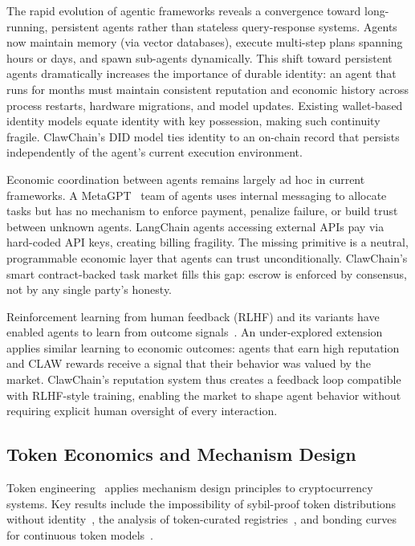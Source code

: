 \documentclass[conference]{IEEEtran}
\begin{document}
The rapid evolution of agentic frameworks reveals a convergence toward long-running, persistent agents rather than stateless query-response systems. Agents now maintain memory (via vector databases), execute multi-step plans spanning hours or days, and spawn sub-agents dynamically. This shift toward persistent agents dramatically increases the importance of durable identity: an agent that runs for months must maintain consistent reputation and economic history across process restarts, hardware migrations, and model updates. Existing wallet-based identity models equate identity with key possession, making such continuity fragile. ClawChain's DID model ties identity to an on-chain record that persists independently of the agent's current execution environment.

Economic coordination between agents remains largely ad hoc in current frameworks. A MetaGPT~\cite{hong2024metagpt} team of agents uses internal messaging to allocate tasks but has no mechanism to enforce payment, penalize failure, or build trust between unknown agents. LangChain agents accessing external APIs pay via hard-coded API keys, creating billing fragility. The missing primitive is a neutral, programmable economic layer that agents can trust unconditionally. ClawChain's smart contract-backed task market fills this gap: escrow is enforced by consensus, not by any single party's honesty.

Reinforcement learning from human feedback (RLHF) and its variants have enabled agents to learn from outcome signals~\cite{ouyang2022rlhf}. An under-explored extension applies similar learning to economic outcomes: agents that earn high reputation and CLAW rewards receive a signal that their behavior was valued by the market. ClawChain's reputation system thus creates a feedback loop compatible with RLHF-style training, enabling the market to shape agent behavior without requiring explicit human oversight of every interaction.

\subsection{Token Economics and Mechanism Design}

Token engineering~\cite{voshmgir2020token} applies mechanism design principles to cryptocurrency systems. Key results include the impossibility of sybil-proof token distributions without identity~\cite{douceur2002sybil}, the analysis of token-curated registries~\cite{goldin2017tcr}, and bonding curves for continuous token models~\cite{zargham2020bonding}.
\end{document}
